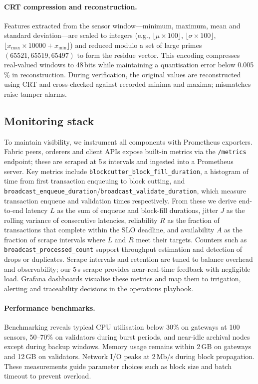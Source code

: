 \documentclass[12pt,onecolumn]{IEEEtran} %
\begin{document}
\paragraph{CRT compression and reconstruction.}
Features extracted from the sensor window—minimum, maximum, mean and standard deviation—are scaled to integers (e.g., $\lfloor\mu \times 100\rfloor$, $\lfloor\sigma \times 100\rfloor$, $\lfloor x_{\max}\times 10000 + x_{\min}\rfloor$) and reduced modulo a set of large primes $(65521,65519,65497)$ to form the residue vector. This encoding compresses real-valued windows to 48\,bits while maintaining a quantisation error below 0.005\,\% in reconstruction. During verification, the original values are reconstructed using CRT and cross-checked against recorded minima and maxima; mismatches raise tamper alarms.

\subsection{Monitoring stack}
To maintain visibility, we instrument all components with Prometheus exporters. Fabric peers, orderers and client APIs expose built-in metrics via the \texttt{/metrics} endpoint; these are scraped at 5\,s intervals and ingested into a Prometheus server. Key metrics include \texttt{blockcutter\_block\_fill\_duration}, a histogram of time from first transaction enqueuing to block cutting, and \texttt{broadcast\_enqueue\_duration}/\texttt{broadcast\_validate\_duration}, which measure transaction enqueue and validation times respectively. From these we derive end-to-end latency $L$ as the sum of enqueue and block-fill durations, jitter $J$ as the rolling variance of consecutive latencies, reliability $R$ as the fraction of transactions that complete within the SLO deadline, and availability $A$ as the fraction of scrape intervals where $L$ and $R$ meet their targets. Counters such as \texttt{broadcast\_processed\_count} support throughput estimation and detection of drops or duplicates. Scrape intervals and retention are tuned to balance overhead and observability; our 5\,s scrape provides near-real-time feedback with negligible load. Grafana dashboards visualise these metrics and map them to irrigation, alerting and traceability decisions in the operations playbook.

\paragraph{Performance benchmarks.}
Benchmarking reveals typical CPU utilisation below 30\% on gateways at 100 sensors, 50–70\% on validators during burst periods, and near-idle archival nodes except during backup windows. Memory usage remains within 2\,GB on gateways and 12\,GB on validators. Network I/O peaks at 2\,Mb/s during block propagation. These measurements guide parameter choices such as block size and batch timeout to prevent overload.
\end{document}
